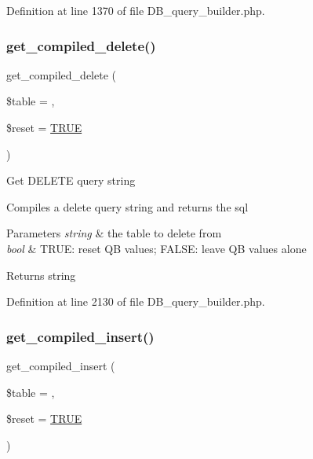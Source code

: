 Definition at line 1370 of file D\+B\+\_\+query\+\_\+builder.\+php.

\mbox{\label{class_c_i___d_b__query__builder_a3e2f8775363646e099009ff62b25a21a}} 
\subsubsection{\texorpdfstring{get\_compiled\_delete()}{get\_compiled\_delete()}}
{\footnotesize\ttfamily get\+\_\+compiled\+\_\+delete (\begin{DoxyParamCaption}\item[{}]{\$table = {\ttfamily \textquotesingle{}\textquotesingle{}},  }\item[{}]{\$reset = {\ttfamily \mbox{\hyperlink{constants_8php_ae04a3efe6aa42044f803ee90c2277846}{T\+R\+UE}}} }\end{DoxyParamCaption})}

Get D\+E\+L\+E\+TE query string

Compiles a delete query string and returns the sql


\begin{DoxyParams}{Parameters}
{\em string} & the table to delete from \\
\hline
{\em bool} & T\+R\+UE\+: reset QB values; F\+A\+L\+SE\+: leave QB values alone \\
\hline
\end{DoxyParams}
\begin{DoxyReturn}{Returns}
string 
\end{DoxyReturn}


Definition at line 2130 of file D\+B\+\_\+query\+\_\+builder.\+php.

\mbox{\label{class_c_i___d_b__query__builder_a09abce3658cfaba8d8a148c91a9be0ea}} 
\subsubsection{\texorpdfstring{get\_compiled\_insert()}{get\_compiled\_insert()}}
{\footnotesize\ttfamily get\+\_\+compiled\+\_\+insert (\begin{DoxyParamCaption}\item[{}]{\$table = {\ttfamily \textquotesingle{}\textquotesingle{}},  }\item[{}]{\$reset = {\ttfamily \mbox{\hyperlink{constants_8php_ae04a3efe6aa42044f803ee90c2277846}{T\+R\+UE}}} }\end{DoxyParamCaption})}

